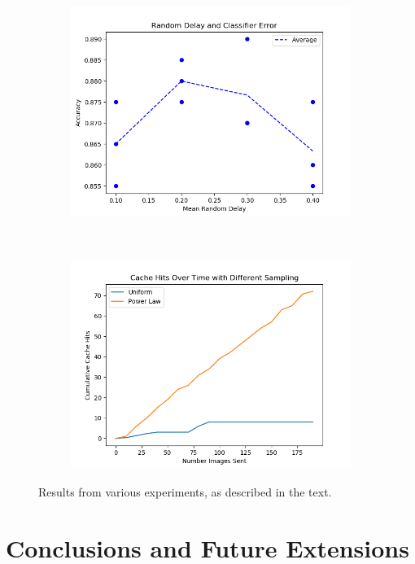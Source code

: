 \documentclass[11pt]{article}
\begin{document}
\begin{figure}[h]
\begin{subfigure}{0.45\textwidth}
        \includegraphics[width=\textwidth]{plot_2_final.png}
    \end{subfigure}
    ~
    \begin{subfigure}{0.45\textwidth}
        \includegraphics[width=\textwidth]{cache_over_time.png}
    \end{subfigure}
    \caption{Results from various experiments, as described in the text.}
    \label{fig:results}
\end{figure}



\section{Conclusions and Future Extensions}
\end{document}
